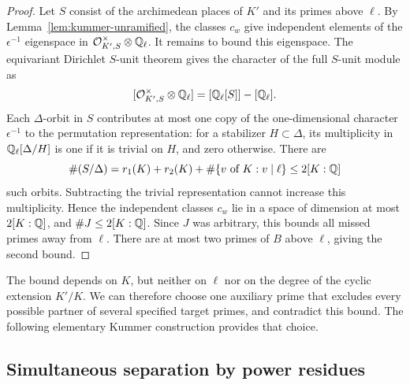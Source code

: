 \begin{proof}
Let $S$ consist of the archimedean places of $K'$ and its primes above $\ell$. By Lemma~\ref{lem:kummer-unramified}, the classes $c_w$ give independent elements of the $\epsilon^{-1}$ eigenspace in $\mathcal O_{K',S}^{\times}\otimes\mathbb Q_\ell$. It remains to bound this eigenspace. The equivariant Dirichlet $S$-unit theorem \cite[Section~3]{bass1966} gives the character of the full $S$-unit module as
\[
 [\mathcal O_{K',S}^{\times}\otimes\mathbb Q_\ell]
   =[\mathbb Q_\ell[S]]-[\mathbb Q_\ell].
\]
Each $\Delta$-orbit in $S$ contributes at most one copy of the one-dimensional character $\epsilon^{-1}$ to the permutation representation: for a stabilizer $H\subset\Delta$, its multiplicity in $\mathbb Q_\ell[\Delta/H]$ is one if it is trivial on $H$, and zero otherwise. There are
\[
 \#(S/\Delta)
 =r_1(K)+r_2(K)+\#\{v\text{ of }K:v\mid\ell\}
 \le2[K:\mathbb Q]
\]
such orbits. Subtracting the trivial representation cannot increase this multiplicity. Hence the independent classes $c_w$ lie in a space of dimension at most $2[K:\mathbb Q]$, and $\#J\le2[K:\mathbb Q]$. Since $J$ was arbitrary, this bounds all missed primes away from $\ell$. There are at most two primes of $B$ above $\ell$, giving the second bound.
\end{proof}

The bound depends on $K$, but neither on $\ell$ nor on the degree of the cyclic extension $K'/K$. We can therefore choose one auxiliary prime that excludes every possible partner of several specified target primes, and contradict this bound. The following elementary Kummer construction provides that choice.

\subsection{Simultaneous separation by power residues}

